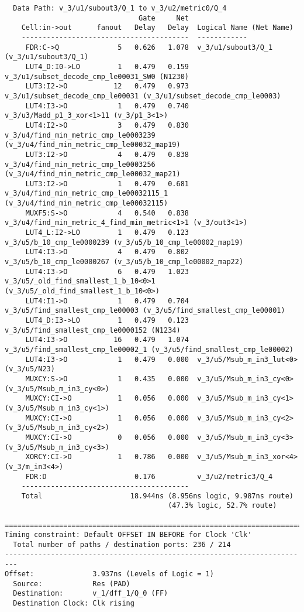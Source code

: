 \documentclass[14pt]{report}
\begin{document}
{\begin{verbatim}
  Data Path: v_3/u1/subout3/Q_1 to v_3/u2/metric0/Q_4
                                Gate     Net
    Cell:in->out      fanout   Delay   Delay  Logical Name (Net Name)
    ----------------------------------------  ------------
     FDR:C->Q              5   0.626   1.078  v_3/u1/subout3/Q_1 (v_3/u1/subout3/Q_1)
     LUT4_D:I0->LO         1   0.479   0.159  v_3/u1/subset_decode_cmp_le00031_SW0 (N1230)
     LUT3:I2->O           12   0.479   0.973  v_3/u1/subset_decode_cmp_le00031 (v_3/u1/subset_decode_cmp_le0003)
     LUT4:I3->O            1   0.479   0.740  v_3/u3/Madd_p1_3_xor<1>11 (v_3/p1_3<1>)
     LUT4:I2->O            3   0.479   0.830  v_3/u4/find_min_metric_cmp_le0003239 (v_3/u4/find_min_metric_cmp_le00032_map19)
     LUT3:I2->O            4   0.479   0.838  v_3/u4/find_min_metric_cmp_le0003256 (v_3/u4/find_min_metric_cmp_le00032_map21)
     LUT3:I2->O            1   0.479   0.681  v_3/u4/find_min_metric_cmp_le00032115_1 (v_3/u4/find_min_metric_cmp_le00032115)
     MUXF5:S->O            4   0.540   0.838  v_3/u4/find_min_metric_4_find_min_metric<1>1 (v_3/out3<1>)
     LUT4_L:I2->LO         1   0.479   0.123  v_3/u5/b_10_cmp_le0000239 (v_3/u5/b_10_cmp_le00002_map19)
     LUT4:I3->O            4   0.479   0.802  v_3/u5/b_10_cmp_le0000267 (v_3/u5/b_10_cmp_le00002_map22)
     LUT4:I3->O            6   0.479   1.023  v_3/u5/_old_find_smallest_1_b_10<0>1 (v_3/u5/_old_find_smallest_1_b_10<0>)
     LUT4:I1->O            1   0.479   0.704  v_3/u5/find_smallest_cmp_le00003 (v_3/u5/find_smallest_cmp_le00001)
     LUT4_D:I3->LO         1   0.479   0.123  v_3/u5/find_smallest_cmp_le0000152 (N1234)
     LUT4:I3->O           16   0.479   1.074  v_3/u5/find_smallest_cmp_le00002_1 (v_3/u5/find_smallest_cmp_le00002)
     LUT4:I3->O            1   0.479   0.000  v_3/u5/Msub_m_in3_lut<0> (v_3/u5/N23)
     MUXCY:S->O            1   0.435   0.000  v_3/u5/Msub_m_in3_cy<0> (v_3/u5/Msub_m_in3_cy<0>)
     MUXCY:CI->O           1   0.056   0.000  v_3/u5/Msub_m_in3_cy<1> (v_3/u5/Msub_m_in3_cy<1>)
     MUXCY:CI->O           1   0.056   0.000  v_3/u5/Msub_m_in3_cy<2> (v_3/u5/Msub_m_in3_cy<2>)
     MUXCY:CI->O           0   0.056   0.000  v_3/u5/Msub_m_in3_cy<3> (v_3/u5/Msub_m_in3_cy<3>)
     XORCY:CI->O           1   0.786   0.000  v_3/u5/Msub_m_in3_xor<4> (v_3/m_in3<4>)
     FDR:D                     0.176          v_3/u2/metric3/Q_4
    ----------------------------------------
    Total                     18.944ns (8.956ns logic, 9.987ns route)
                                       (47.3% logic, 52.7% route)

=========================================================================
Timing constraint: Default OFFSET IN BEFORE for Clock 'Clk'
  Total number of paths / destination ports: 236 / 214
-------------------------------------------------------------------------
Offset:              3.937ns (Levels of Logic = 1)
  Source:            Res (PAD)
  Destination:       v_1/dff_1/Q_0 (FF)
  Destination Clock: Clk rising


\end{verbatim}}
\end{document}

